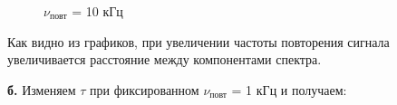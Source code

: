 \documentclass[a4paper,12pt]{article}
\theoremstyle{definition}
\begin{document}
\begin{enumerate}
\begin{figure}[h]
\begin{minipage}[h]{0.47\linewidth}
\end{minipage}
\hfill
\begin{minipage}[h]{0.47\linewidth}
 $\nu_\text{повт}$ = 10 кГц  \\
\end{minipage}
\caption{}
\label{ris:experimentalcorrelationsignals}
\end{figure}


Как видно из графиков, при увеличении частоты повторения сигнала увеличивается расстояние между компонентами спектра.

\newpage


\textbf{б.} Изменяем $\tau$ при фиксированном $\nu_\text{повт}$ = 1 кГц и получаем:


\end{enumerate}
\end{document}
